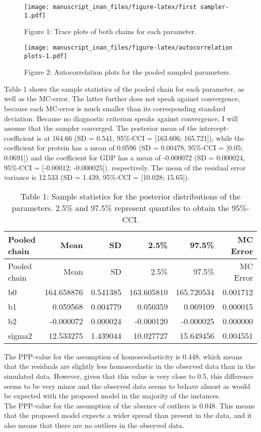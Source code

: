 \documentclass[
]{article}
\begin{document}
\begin{figure}
\centering
\texttt{[image: manuscript\_inan\_files/figure-latex/first sampler-1.pdf]}
\caption{\label{fig:figs}Figure 1: Trace plots of both chains for each
parameter.}
\end{figure}

\begin{figure}
\centering
\texttt{[image: manuscript\_inan\_files/figure-latex/autocorrelation plots-1.pdf]}
\caption{\label{fig:figs}Figure 2: Autocorrelation plots for the pooled
sampled parameters.}
\end{figure}

Table 1 shows the sample statistics of the pooled chain for each
parameter, as well as the MC-error. The latter further does not speak
against convergence, because each MC-error is much smaller than its
corresponding standard deviation. Because no diagnostic criterion speaks
against convergence, I will assume that the sampler converged. The
posterior mean of the intercept-coefficient is at 164.66 (SD = 0.541,
95\%-CCI = {[}163.606; 165.721{]}), while the coefficient for protein
has a mean of 0.0596 (SD = 0.00478, 95\%-CCI = {[}0.05; 0.0691{]}) and
the coefficient for GDP has a mean of -0.000072 (SD = 0.000024, 95\%-CCI
= {[}-0.00012; -0.000025{]}). respectively. The mean of the residual
error variance is 12.533 (SD = 1.439, 95\%-CCI = {[}10.028; 15.65{]}).

\begin{longtable}[]{@{}lrrrrr@{}}
\caption{Table 1: Sample statistics for the posterior distributions of
the parameters. 2.5\% and 97.5\% represent quantiles to obtain the
95\%-CCI.}\tabularnewline
\toprule
Pooled chain & Mean & SD & 2.5\% & 97.5\% & MC Error \\
\midrule
\endfirsthead
\toprule
Pooled chain & Mean & SD & 2.5\% & 97.5\% & MC Error \\
\midrule
\endhead
b0 & 164.658876 & 0.541385 & 163.605810 & 165.720534 & 0.001712 \\
b1 & 0.059568 & 0.004779 & 0.050359 & 0.069109 & 0.000015 \\
b2 & -0.000072 & 0.000024 & -0.000120 & -0.000025 & 0.000000 \\
sigma2 & 12.533275 & 1.439044 & 10.027727 & 15.649456 & 0.004551 \\
\bottomrule
\end{longtable}

The PPP-value for the assumption of homoscedasticity is 0.448, which
means that the residuals are slightly less homoscedastic in the observed
data than in the simulated data. However, given that this value is very
close to 0.5, this difference seems to be very minor and the observed
data seems to behave almost as would be expected with the proposed model
in the majority of the instances.\\
The PPP-value for the assumption of the absence of outliers is 0.048.
This means that the proposed model expects a wider spread than present
in the data, and it also means that there are no outliers in the
observed data.
\end{document}
